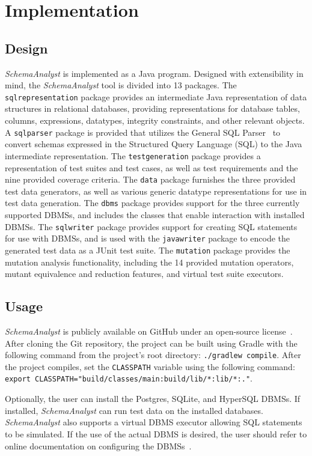 \section{Implementation}
\subsection{Design}
\textit{SchemaAnalyst} is implemented as a Java program.  Designed with extensibility in mind, the
\textit{SchemaAnalyst} tool is divided into 13 packages. The \texttt{sqlrepresentation} package
provides an intermediate Java representation of data structures in relational databases,
providing representations for database tables, columns, expressions, datatypes, integrity
constraints, and other relevant objects. A \texttt{sqlparser} package is provided that utilizes the
General SQL Parser~\cite{} to convert schemas expressed in the Structured Query Language (SQL) to the
Java intermediate representation. The \texttt{testgeneration} package provides a representation of test
suites and test cases, as well as test requirements and the nine provided coverage criteria. The
\texttt{data} package furnishes the three provided test data generators, as well as various generic
datatype representations for use in test data generation. The \texttt{dbms} package provides support
for the three currently supported DBMSs, and includes the classes that enable interaction with
installed DBMSs. The \texttt{sqlwriter} package provides support for creating SQL statements for use
with DBMSs, and is used with the \texttt{javawriter} package to encode the generated test data as a
JUnit test suite. The \texttt{mutation} package provides the mutation analysis functionality, 
including the 14 provided mutation operators, mutant equivalence and reduction features, and virtual
test suite executors.

\subsection{Usage}

\textit{SchemaAnalyst} is publicly available on GitHub under an open-source license~\cite{tool}. After
cloning the Git repository, the project can be built using Gradle with the following command from the
project's root directory: \lstinline{./gradlew compile}. After the project compiles, set the
\lstinline{CLASSPATH} variable using the following command: 
\lstinline{export CLASSPATH="build/classes/main:build/lib/*:lib/*:."}.

Optionally, the user can install the Postgres, SQLite, and HyperSQL DBMSs. If installed, \textit{SchemaAnalyst}
can run test data on the installed databases. \textit{SchemaAnalyst} also supports a virtual DBMS executor
allowing SQL statements to be simulated. If the use of the actual DBMS is desired, the user should refer to
online documentation on configuring the DBMSs~\cite{tool}.


